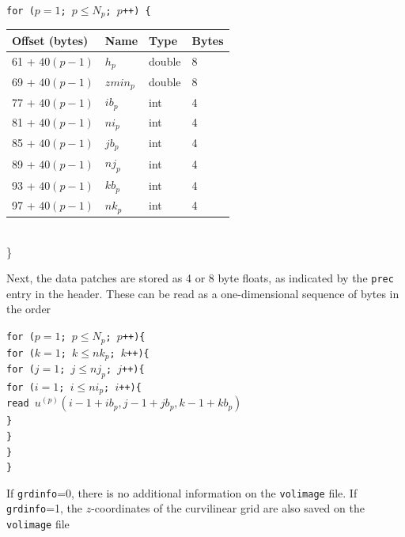 \documentclass[11pt]{report}
\begin{document}
{\samepage
\begin{flushleft}
{\tt for ($p=1$; $p\leq N_p$; $p$++) \{}\nopagebreak \\ 
\hspace{5mm}
\begin{tabular}{llll}\hline
Offset (bytes) & Name & Type & Bytes \\ \hline
61 + $40(p - 1)$ & $h_{p}$ & double & 8 \\ \hline
69 + $40(p - 1)$ & $zmin_{p}$ & double & 8 \\ \hline
77 + $40(p - 1)$ & $ib_{p}$ & int & 4 \\ \hline
81 + $40(p - 1)$ & $ni_{p}$ & int & 4 \\ \hline
85 + $40(p - 1)$ & $jb_{p}$ & int & 4 \\ \hline
89 + $40(p - 1)$ & $nj_{p}$ & int & 4 \\ \hline
93 + $40(p - 1)$ & $kb_{p}$ & int & 4 \\ \hline
97 + $40(p - 1)$ & $nk_{p}$ & int & 4 \\ \hline
\end{tabular}\\
\}
\end{flushleft}
}
Next, the data patches are stored as 4 or 8 byte floats, as indicated by the \verb+prec+ entry 
in the header. These can be read as a one-dimensional sequence of bytes in the order 
\begin{flushleft}
{\tt for ($p=1$; $p\leq N_p$; $p$++)\{\\
\hspace{5mm}for ($k=1$; $k\leq nk_p$; $k$++)\{\\
\hspace{10mm}for ($j=1$; $j\leq nj_p$; $j$++)\{\\
\hspace{15mm}for ($i=1$; $i\leq ni_p$; $i$++)\{\\
\hspace{20mm}read $u^{(p)}(i-1+ib_p, j-1+jb_p,k-1+kb_p)$\\
\hspace{15mm}\}\\
\hspace{10mm}\}\\
\hspace{5mm}\}\\
\}}
\end{flushleft}
If {\tt grdinfo}=0, there is no additional information on the \verb+volimage+ file.
If {\tt grdinfo}=1, the $z$-coordinates of the curvilinear grid are also saved on the \verb+volimage+ file
\end{document}
